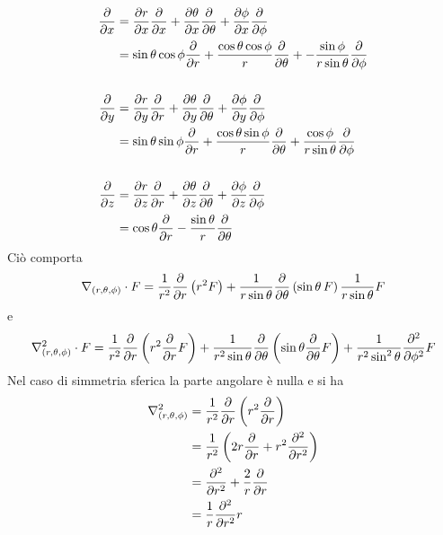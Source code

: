 \documentclass{article}
\begin{document}
\begin{align}
    \frac{\partial}{\partial x} &= \frac{\partial r}{\partial x}\frac{\partial}{\partial x} + \frac{\partial \theta}{\partial x}\frac{\partial}{\partial \theta} + \frac{\partial \phi}{\partial x}\frac{\partial}{\partial \phi} \notag \\
    &= \sin \theta \cos \phi \frac{\partial}{\partial r} + \frac{\cos \theta \cos \phi}{r}\frac{\partial}{\partial \theta} +- \frac{\sin \phi}{r\sin\theta}\frac{\partial}{\partial \phi} \notag \\ \notag \\
    \frac{\partial}{\partial y} &= \frac{\partial r}{\partial y}\frac{\partial}{\partial r} + \frac{\partial \theta}{\partial y}\frac{\partial}{\partial \theta} + \frac{\partial \phi}{\partial y}\frac{\partial}{\partial \phi} \notag \\
    &= \sin\theta \sin \phi \frac{\partial}{\partial r} + \frac{\cos \theta \sin \phi}{r}\frac{\partial}{\partial \theta} + \frac{\cos \phi}{r\sin\theta}\frac{\partial}{\partial \phi} \notag \\ \notag \\
    \frac{\partial}{\partial z} &= \frac{\partial r}{\partial z}\frac{\partial}{\partial r} + \frac{\partial \theta}{\partial z}\frac{\partial}{\partial \theta} + \frac{\partial \phi}{\partial z}\frac{\partial}{\partial \phi} \notag \\
    &= \cos \theta \frac{\partial}{\partial r} - \frac{\sin \theta}{r}\frac{\partial}{\partial \theta} \notag 
\end{align}
Ciò comporta 
\begin{gather}
    \nabla_{(r, \theta, \phi)} \cdot F = \frac{1}{r^2}\frac{\partial}{\partial r}\left( r^2F \right) + \frac{1}{r\sin \theta}\frac{\partial}{\partial \theta}\left( \sin \theta \, F \right) \frac{1}{r\sin\theta} F \notag
\end{gather}
e
\begin{gather}
    \nabla^2_{(r, \theta, \phi)} \cdot F = \frac{1}{r^2}\frac{\partial}{\partial r}\left( r^2 \frac{\partial}{\partial r}F \right) + \frac{1}{r^2\sin\theta}\frac{\partial}{\partial \theta}\left( \sin\theta \frac{\partial}{\partial \theta}F \right) + \frac{1}{r^2\sin^2\theta}\frac{\partial^2}{\partial \phi^2}F \notag
\end{gather}
Nel caso di simmetria sferica la parte angolare è nulla e si ha
\begin{align}
    \nabla^2_{(r, \theta, \phi)} &= \frac{1}{r^2}\frac{\partial}{\partial r}\left( r^2 \frac{\partial}{\partial r} \right) \notag \\
    &= \frac{1}{r^2}\left( 2r\frac{\partial}{\partial r} + r^2\frac{\partial^2}{\partial r^2} \right) \notag \\
    &= \frac{\partial^2}{\partial r^2} + \frac{2}{r}\frac{\partial}{\partial r} \notag \\
    &= \frac{1}{r}\frac{\partial^2}{\partial r^2}r \notag
\end{align}
\end{document}
